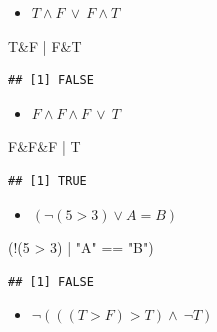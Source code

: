 \documentclass[12pt,a4paper]{article}
\newenvironment{Shaded}{\begin{snugshade}}{\end{snugshade}}
\newcommand{\DecValTok}[1]{\textcolor[rgb]{0.00,0.00,0.81}{#1}}
\newcommand{\NormalTok}[1]{#1}
\newcommand{\SpecialCharTok}[1]{\textcolor[rgb]{0.00,0.00,0.00}{#1}}
\newcommand{\StringTok}[1]{\textcolor[rgb]{0.31,0.60,0.02}{#1}}
\begin{document}
\begin{itemize}
  \item $T \land F \ \lor \ F \land T$
\end{itemize}

\begin{Shaded}
\begin{Highlighting}[]
\NormalTok{    T}\SpecialCharTok{\&}\NormalTok{F }\SpecialCharTok{|}\NormalTok{ F}\SpecialCharTok{\&}\NormalTok{T}
\end{Highlighting}
\end{Shaded}

\begin{verbatim}
## [1] FALSE
\end{verbatim}

\begin{itemize}
  \item $F \land F \land F\ \lor \ T$
\end{itemize}

\begin{Shaded}
\begin{Highlighting}[]
\NormalTok{    F}\SpecialCharTok{\&}\NormalTok{F}\SpecialCharTok{\&}\NormalTok{F }\SpecialCharTok{|}\NormalTok{ T}
\end{Highlighting}
\end{Shaded}

\begin{verbatim}
## [1] TRUE
\end{verbatim}

\begin{itemize}
  \item $(\neg (5 > 3) \lor A = B)$
\end{itemize}

\begin{Shaded}
\begin{Highlighting}[]
\NormalTok{    (}\SpecialCharTok{!}\NormalTok{(}\DecValTok{5} \SpecialCharTok{\textgreater{}} \DecValTok{3}\NormalTok{) }\SpecialCharTok{|} \StringTok{"A"} \SpecialCharTok{==} \StringTok{"B"}\NormalTok{) }
\end{Highlighting}
\end{Shaded}

\begin{verbatim}
## [1] FALSE
\end{verbatim}

\begin{itemize}
  \item $\neg(((T > F) > T) \land \ \neg T)$
\end{itemize}
\end{document}
